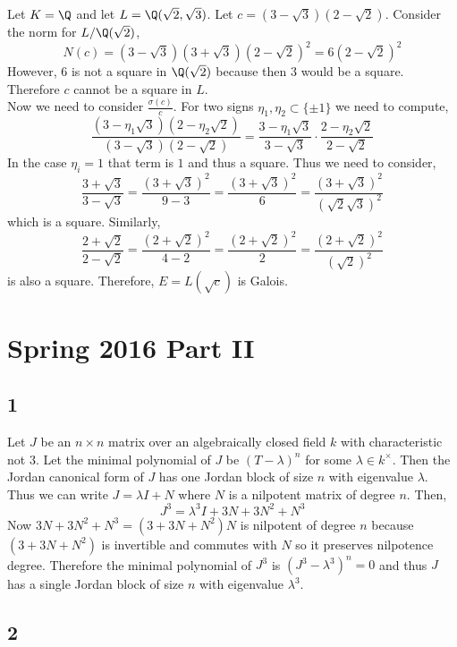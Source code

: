 \documentclass[12pt]{article}
\begin{document}
Let $K = \Q$ and let $L = \Q(\sqrt{2}, \sqrt{3})$. Let $c = (3 - \sqrt{3})(2 - \sqrt{2})$. Consider the norm for $L / \Q(\sqrt{2})$,
\[ N(c) = (3 - \sqrt{3})(3 + \sqrt{3}) (2 - \sqrt{2})^2 = 6 (2 - \sqrt{2})^2 \]
However, $6$ is not a square in $\Q(\sqrt{2})$ because then $3$ would be a square. Therefore $c$ cannot be a square in $L$.
\bigskip\\
Now we need to consider $\frac{\sigma(c)}{c}$. For two signs $\eta_1, \eta_2 \subset \{ \pm 1 \}$ we need to compute,
\[ \frac{(3 - \eta_1 \sqrt{3})(2 - \eta_2 \sqrt{2})}{(3 - \sqrt{3})(2 - \sqrt{2})} = \frac{3 - \eta_1 \sqrt{3}}{3 - \sqrt{3}} \cdot \frac{2 - \eta_2 \sqrt{2}}{2 - \sqrt{2}} \]
In the case $\eta_i = 1$ that term is $1$ and thus a square. Thus we need to consider,
\[ \frac{3 + \sqrt{3}}{3 - \sqrt{3}} = \frac{(3 + \sqrt{3})^2}{9 - 3} = \frac{(3 + \sqrt{3})^2}{6} = \frac{(3 + \sqrt{3})^2}{(\sqrt{2} \sqrt{3})^2} \]
which is a square. Similarly,
\[ \frac{2 + \sqrt{2}}{2 - \sqrt{2}} = \frac{(2 + \sqrt{2})^2}{4 - 2} = \frac{(2 + \sqrt{2})^2}{2} = \frac{(2 + \sqrt{2})^2}{(\sqrt{2})^2} \]
is also a square. Therefore, $E = L(\sqrt{c})$ is Galois.

\section{Spring 2016 Part II}

\subsection{1}

Let $J$ be an $n \times n$ matrix over an algebraically closed field $k$ with characteristic not $3$. Let the minimal polynomial of $J$ be $(T - \lambda)^n$ for some $\lambda \in k^\times$. Then the Jordan canonical form of $J$ has one Jordan block of size $n$ with eigenvalue $\lambda$. Thus we can write $J = \lambda I + N$ where $N$ is a nilpotent matrix of degree $n$. Then,
\[ J^3 = \lambda^3 I + 3 N + 3 N^2 + N^3 \]
Now $3 N + 3 N^2 + N^3 = (3 + 3 N + N^2) N$ is nilpotent of degree $n$ because $(3 + 3 N + N^2)$ is invertible and commutes with $N$ so it preserves nilpotence degree. Therefore the minimal polynomial of $J^3$ is $(J^3 - \lambda^3)^n = 0$ and thus $J$ has a single Jordan block of size $n$ with eigenvalue $\lambda^3$.

\subsection{2}
\end{document}
